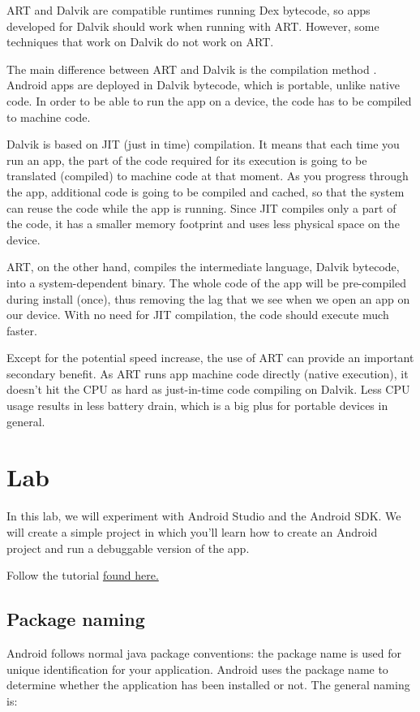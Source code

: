 ART and Dalvik are compatible runtimes running Dex bytecode, so apps developed for Dalvik should work when running with ART. However, some techniques that work on Dalvik do not work on ART. 

The main difference between ART and Dalvik is the compilation method \cite{Vitas2013}. Android apps are deployed in Dalvik bytecode, which is portable, unlike native code. In order to be able to run the app on a device, the code has to be compiled to machine code.

Dalvik is based on JIT (just in time) compilation. It means that each time you run an app, the part of the code required for its execution is going to be translated (compiled) to machine code at that moment. As you progress through the app, additional code is going to be compiled and cached, so that the system can reuse the code while the app is running. Since JIT compiles only a part of the code, it has a smaller memory footprint and uses less physical space on the device.

ART, on the other hand, compiles the intermediate language, Dalvik bytecode, into a system-dependent binary. The whole code of the app will be pre-compiled during install (once), thus removing the lag that we see when we open an app on our device. With no need for JIT compilation, the code should execute much faster.

Except for the potential speed increase, the use of ART can provide an important secondary benefit. As ART runs app machine code directly (native execution), it doesn't hit the CPU as hard as just-in-time code compiling on Dalvik. Less CPU usage results in less battery drain, which is a big plus for portable devices in general.

\newpage
\section{Lab}
In this lab, we will experiment with Android Studio and the Android SDK. We will create a simple project in which you’ll learn how to create an Android project and run a debuggable version of the app.

\begin{exercise}
	Follow the tutorial \href{https://developer.android.com/training/basics/firstapp/index.html}{found here.}
\end{exercise}

\subsection{Package naming}
Android follows normal java package conventions: the package name is used for unique identification for your application. Android uses the package name to determine whether the application has been installed or not. The general naming is:

